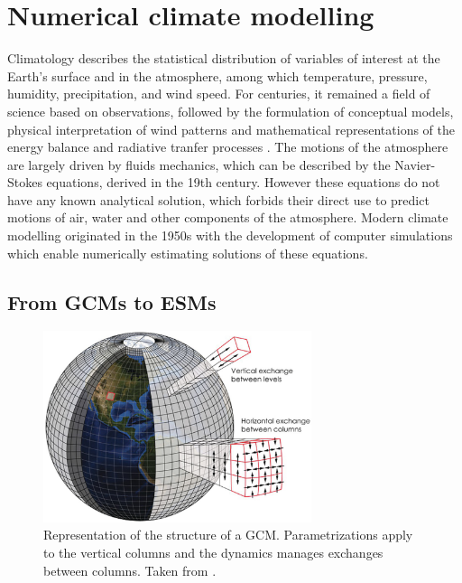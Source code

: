 \section{Numerical climate modelling}
Climatology describes the statistical distribution of variables of interest at the Earth's surface and in the atmosphere, among which temperature, pressure, humidity, precipitation, and wind speed.
For centuries, it remained a field of science based on observations, followed by the formulation of conceptual models, physical interpretation of wind patterns \citep{Halley1686, Hadley1735, Dove1837, Ferrel1856} and mathematical representations of the energy balance and radiative tranfer processes \citep{edwards_history_2011}.
The motions of the atmosphere are largely driven by fluids mechanics, which can be described by the Navier-Stokes equations, derived in the 19th century. However these equations do not have any known analytical solution, which forbids their direct use to predict motions of air, water and other components of the atmosphere. 
Modern climate modelling originated in the 1950s with the development of computer simulations which enable numerically estimating solutions of these equations.

\subsection{From GCMs to ESMs}

\begin{figure}[hbtp]
    \centering
    \includegraphics[width=0.7\textwidth]{images/intro/GCM_structure_kotamarthi.png}
    \caption{Representation of the structure of a GCM. Parametrizations apply to the vertical columns and the dynamics manages exchanges between columns. Taken from \citep{kotamarthi_downscaling_2021}. 
    }
    \label{fig:GCM}
\end{figure}


